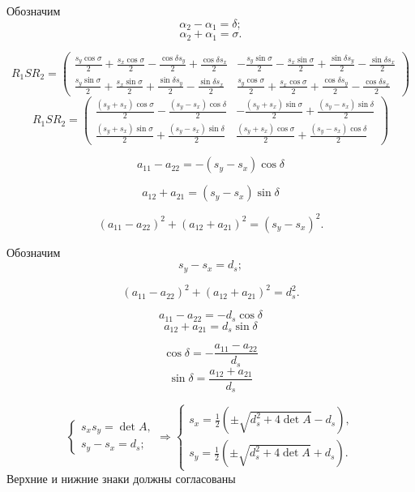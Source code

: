 Обозначим 
$$\alpha_2 - \alpha_1 = \delta;$$
$$\alpha_2 + \alpha_1 = \sigma.$$

$$
R_1SR_2 = 
\begin{pmatrix}
 \frac{{s_y} \cos{\sigma}}{2} + \frac{{s_x} \cos{\sigma}}{2} - \frac{\cos{\delta} {s_y}}{2} + \frac{\cos{\delta} {s_x}}{2} &
-\frac{{s_y} \sin{\sigma}}{2} - \frac{{s_x} \sin{\sigma}}{2} + \frac{\sin{\delta} {s_y}}{2} - \frac{\sin{\delta} {s_x}}{2}\\
 \frac{{s_y} \sin{\sigma}}{2} + \frac{{s_x} \sin{\sigma}}{2} + \frac{\sin{\delta} {s_y}}{2} - \frac{\sin{\delta} {s_x}}{2} &
 \frac{{s_y} \cos{\sigma}}{2} + \frac{{s_x} \cos{\sigma}}{2} + \frac{\cos{\delta} {s_y}}{2} - \frac{\cos{\delta} {s_x}}{2}
\end{pmatrix}
$$
$$
R_1SR_2 = 
\begin{pmatrix}
 \frac{(s_y + s_x) \cos{\sigma}}{2} - \frac{(s_y - s_x)\cos{\delta}}{2} &
-\frac{(s_y + s_x) \sin{\sigma}}{2} + \frac{(s_y - s_x)\sin{\delta}}{2}\\
 \frac{(s_y + s_x) \sin{\sigma}}{2} + \frac{(s_y - s_x)\sin{\delta}}{2} &
 \frac{(s_y + s_x) \cos{\sigma}}{2} + \frac{(s_y - s_x)\cos{\delta}}{2}
\end{pmatrix}
$$

$$a_{11} - a_{22} = - \left( {s_y}-{s_x}\right) \cos\delta $$

$$a_{12} + a_{21} = \left( {s_y}-{s_x}\right) \sin\delta $$

$$\left(a_{11} - a_{22}\right)^2 + \left( a_{12} + a_{21} \right)^2 = \left( {s_y}-{s_x}\right)^2.$$

Обозначим
$${s_y}-{s_x} = d_s;$$

$$\left(a_{11} - a_{22}\right)^2 + \left( a_{12} + a_{21} \right)^2 = d_s^2.$$

$$a_{11} - a_{22} = - d_s \cos\delta $$
$$a_{12} + a_{21} = d_s \sin\delta $$

$$\cos\delta = -\frac{a_{11} - a_{22}}{d_s} $$
$$\sin\delta =  \frac{a_{12} + a_{21}}{d_s} $$

$$\begin{cases}
	s_x s_y = \det A,\\
	{s_y} - {s_x} = d_s;
\end{cases}
\Rightarrow
\begin{cases}
	s_x = \frac{1}{2}\left(\pm \sqrt{d_s^2 + 4 \det A} - d_s\right),\\
	s_y = \frac{1}{2}\left(\pm \sqrt{d_s^2 + 4 \det A} + d_s\right).
\end{cases}
$$
Верхние и нижние знаки должны согласованы
	
